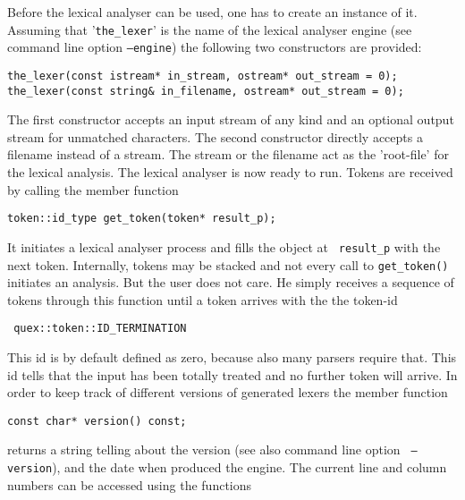 Before the lexical analyser can be used, one has to create an instance of it.
Assuming that '{\tt the\_lexer}' is the name of the lexical analyser engine
(see command line option {\tt --engine}) the following two constructors are
provided:

\begin{description}
  \item[\tt the\_lexer(const istream* in\_stream, ostream* out\_stream = 0);]
  \item[\tt the\_lexer(const string\& in\_filename, ostream* out\_stream = 0);]
\end{description}

The first constructor accepts an input stream of any kind and an optional
output stream for unmatched characters. The second constructor directly
accepts a filename instead of a stream. The stream or the filename act
as the 'root-file' for the lexical analysis. The lexical analyser is now
ready to run. Tokens are received by calling the member function

\begin{description}
  \item [\tt token::id\_type   get\_token(token* result\_p);]
\end{description}

It initiates a lexical analyser process and fills the object at {\tt
  result\_p} with the next token. Internally, tokens may be stacked 
and not every call to {\tt get\_token()} initiates an analysis. But the
user does not care. He simply receives a sequence of tokens through this
function until a token arrives with the the token-id 

\begin{center}
\begin{verbatim}
 quex::token::ID_TERMINATION
\end{verbatim}
\end{center}

This id is by default defined as zero, because also many parsers require that.
This id tells that the input has been totally treated and no further token
will arrive. In order to keep track of different versions of generated
lexers the member function

\begin{description}
  \item [\tt const char* version() const;]
\end{description}

returns a string telling about the version (see also command line option {\tt
  --version}), and the date when {\quex} produced the engine.  The current
line and column numbers can be accessed using the functions

